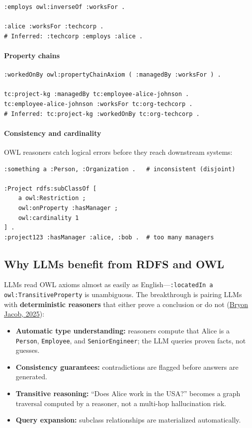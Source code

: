 \begin{verbatim}
:employs owl:inverseOf :worksFor .

:alice :worksFor :techcorp .
# Inferred: :techcorp :employs :alice .
\end{verbatim}

\paragraph{Property chains}

\begin{verbatim}
:workedOnBy owl:propertyChainAxiom ( :managedBy :worksFor ) .

tc:project-kg :managedBy tc:employee-alice-johnson .
tc:employee-alice-johnson :worksFor tc:org-techcorp .
# Inferred: tc:project-kg :workedOnBy tc:org-techcorp .
\end{verbatim}

\paragraph{Consistency and cardinality}

OWL reasoners catch logical errors before they reach downstream systems:

\begin{verbatim}
:something a :Person, :Organization .   # inconsistent (disjoint)

:Project rdfs:subClassOf [
    a owl:Restriction ;
    owl:onProperty :hasManager ;
    owl:cardinality 1
] .
:project123 :hasManager :alice, :bob .  # too many managers
\end{verbatim}

\subsection{Why LLMs benefit from RDFS and OWL}

LLMs read OWL axioms almost as easily as English---\texttt{:locatedIn a
owl:TransitiveProperty} is unambiguous. The breakthrough is pairing LLMs with
\textbf{deterministic reasoners} that either prove a conclusion or do not
(\href{https://bryon.io/from-facts-to-knowledge-the-layer-cake-of-rdfs-and-owl-e84819d8075d}{Bryon Jacob, 2025}):

\begin{itemize}
  \item \textbf{Automatic type understanding:} reasoners compute that Alice is a
        \texttt{Person}, \texttt{Employee}, and \texttt{SeniorEngineer}; the LLM
        queries proven facts, not guesses.
  \item \textbf{Consistency guarantees:} contradictions are flagged before answers
        are generated.
  \item \textbf{Transitive reasoning:} ``Does Alice work in the USA?'' becomes a
        graph traversal computed by a reasoner, not a multi-hop hallucination risk.
  \item \textbf{Query expansion:} subclass relationships are materialized
        automatically.
\end{itemize}

